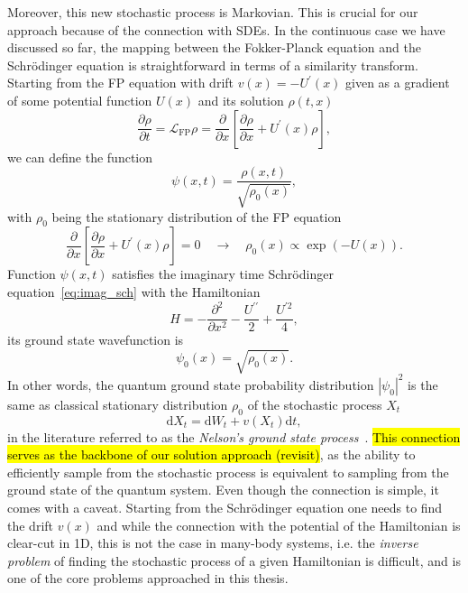 Moreover, this new stochastic process is Markovian. This is crucial for our approach because of the connection with SDEs. In the continuous case we have discussed so far, the mapping between the Fokker-Planck equation and the Schr\" odinger equation is straightforward in terms of a similarity transform. Starting from the FP equation with drift $v(x)=-U^\prime(x)$ given as a gradient of some potential function $U(x)$ and its solution $\rho(t, x)$ 
\begin{equation}
	\frac{\partial \rho}{\partial t}=\mathcal{L}_{\mathrm{FP}} \rho=\frac{\partial}{\partial x}\left[\frac{\partial \rho}{\partial x}+U^{\prime}(x) \rho\right],
\end{equation}
we can define the function 
\begin{equation}
	\psi(x, t)=\frac{\rho(x, t)}{\sqrt{\rho_{0}(x)}},
\end{equation}
with $\rho_{0}$ being the stationary distribution of the FP equation
\begin{equation}
	\frac{\partial}{\partial x}\left[\frac{\partial \rho}{\partial x}+U^{\prime}(x) \rho\right] = 0 \quad \rightarrow \quad \rho_{0}(x) \propto \exp (-U(x)).
\end{equation}
Function $\psi(x, t)$ satisfies the imaginary time Schr\" odinger equation~\eqref{eq:imag_sch} with the Hamiltonian
\begin{equation}
	H=-\frac{\partial^{2}}{\partial x^{2}}-\frac{U^{\prime \prime}}{2}+\frac{U^{\prime 2}}{4}, 
\end{equation}
its ground state wavefunction is 
\begin{equation}
	\psi_{0}(x)=\sqrt{\rho_{0}(x)}.
\end{equation}
In other words, the quantum ground state probability distribution $|\psi_{0}|^2$ is the same as classical stationary distribution $\rho_{0}$ of the stochastic process $X_{t}$
\begin{equation}
	\mathrm{d} X_{t}=\mathrm{d} W_{t}+v\left(X_{t}\right) \mathrm{d} t,
\end{equation}
in the literature referred to as the \emph{Nelson's ground state process}~\cite{nelson1967dynamical, albeverio1977energy}. \hl{This connection serves as the backbone of our solution approach (revisit)}, as the ability to efficiently sample from the stochastic process is equivalent to sampling from the ground state of the quantum system. Even though the connection is simple, it comes with a caveat. Starting from the Schr\" odinger equation one needs to find the drift $v(x)$ and while the connection with the potential of the Hamiltonian is clear-cut in 1D, this is not the case in many-body systems, i.e. the \emph{inverse problem} of finding the stochastic process of a given Hamiltonian is difficult, and is one of the core problems approached in this thesis.

